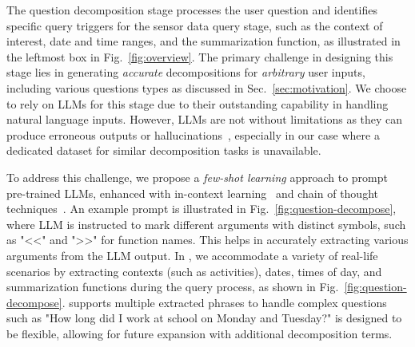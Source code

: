 The question decomposition stage processes the user question and identifies specific query triggers for the sensor data query stage, such as the context of interest, date and time ranges, and the summarization function, as illustrated in the leftmost box in Fig.~\ref{fig:overview}.
The primary challenge in designing this stage lies in generating \textit{accurate} decompositions for \textit{arbitrary} user inputs, including various questions types as discussed in Sec.~\ref{sec:motivation}.
We choose to rely on LLMs for this stage due to their outstanding capability in handling natural language inputs.
However, LLMs are not without limitations as they can produce erroneous outputs or hallucinations~\cite{huang2023survey}, especially in our case where a dedicated dataset for similar decomposition tasks is unavailable.




%
%
To address this challenge, we propose a \textit{few-shot learning} approach to prompt pre-trained LLMs, enhanced with in-context learning~\cite{alayrac2022flamingo,shao2023prompting} and chain of thought techniques~\cite{chuCoTReasoningSurvey2024,lu2022learn}.
An example prompt is illustrated in Fig.~\ref{fig:question-decompose}, where LLM is instructed to mark different arguments with distinct symbols, such as "<<" and ">>" for function names. This helps in accurately extracting various arguments from the LLM output. 
In \Method, we accommodate a variety of real-life scenarios by extracting contexts (such as activities), dates, times of day, and summarization functions during the query process, as shown in Fig.~\ref{fig:question-decompose}.
\Method supports multiple extracted phrases to handle complex questions such as "How long did I work at school on Monday and Tuesday?"
\Method is designed to be flexible, allowing for future expansion with additional decomposition terms.

